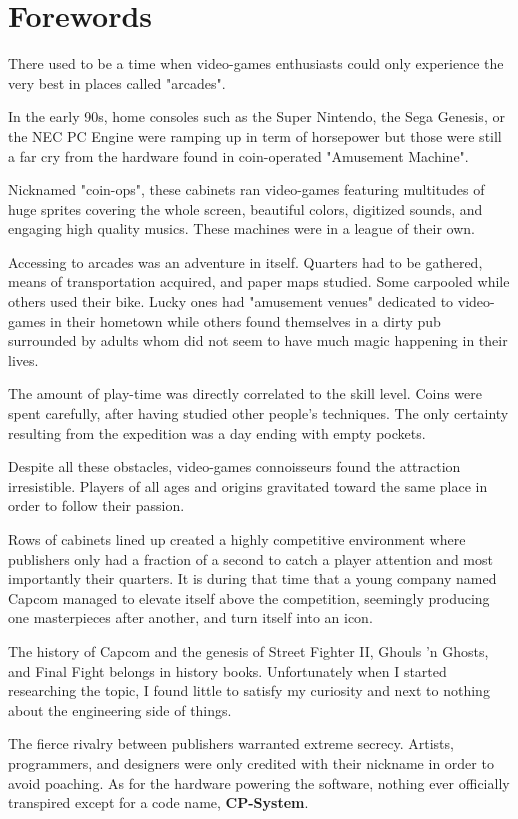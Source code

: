 \chapter*{Forewords}

There used to be a time when video-games enthusiasts could only experience the very best in places called "arcades". 

In the early 90s, home consoles such as the Super Nintendo, the Sega Genesis, or the NEC PC Engine were ramping up in term of horsepower but those were still a far cry from the hardware found in coin-operated "Amusement Machine".

Nicknamed "coin-ops", these cabinets ran video-games featuring multitudes of huge sprites covering the whole screen, beautiful colors, digitized sounds, and engaging high quality musics. These machines were in a league of their own.

Accessing to arcades was an adventure in itself. Quarters had to be gathered, means of transportation acquired, and paper maps studied. Some carpooled while others used their bike. Lucky ones had "amusement venues" dedicated to video-games in their hometown while others found themselves in a dirty pub surrounded by adults whom did not seem to have much magic happening in their lives. 

The amount of play-time was directly correlated to the skill level. Coins were spent carefully, after having studied other people's techniques. The only certainty resulting from the expedition was a day ending with empty pockets. 

Despite all these obstacles, video-games connoisseurs found the attraction irresistible. Players of all ages and origins gravitated toward the same place in order to follow their passion. 

Rows of cabinets lined up created a highly competitive environment where publishers only had a fraction of a second to catch a player attention and most importantly their quarters. It is during that time that a young company named Capcom  managed to elevate itself above the competition, seemingly producing one masterpieces after another, and turn itself into an icon.

The history of Capcom and the genesis of Street Fighter II, Ghouls 'n Ghosts, and Final Fight belongs in history books. Unfortunately when I started researching the topic, I found little to satisfy my curiosity and next to nothing about the engineering side of things. 

The fierce rivalry between publishers warranted extreme secrecy. Artists, programmers, and designers were only credited with their nickname in order to avoid poaching. As for the hardware powering the software, nothing ever officially transpired except for a code name, \textbf{CP-System}.

